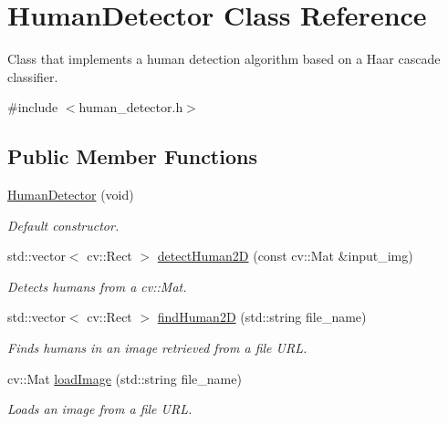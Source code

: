 \hypertarget{classHumanDetector}{\section{Human\-Detector Class Reference}
\label{classHumanDetector}
}


Class that implements a human detection algorithm based on a Haar cascade classifier.  




{\ttfamily \#include $<$human\-\_\-detector.\-h$>$}

\subsection*{Public Member Functions}
\begin{DoxyCompactItemize}
\item 
\hyperlink{classHumanDetector_ae20de86b32803a99c4f81741b8cd6cbb}{Human\-Detector} (void)
\begin{DoxyCompactList}\small\item\em Default constructor. \end{DoxyCompactList}\item 
std\-::vector$<$ cv\-::\-Rect $>$ \hyperlink{classHumanDetector_a9c559b1da68d3a89a8821132a589c528}{detect\-Human2\-D} (const cv\-::\-Mat \&input\-\_\-img)
\begin{DoxyCompactList}\small\item\em Detects humans from a cv\-::\-Mat. \end{DoxyCompactList}\item 
std\-::vector$<$ cv\-::\-Rect $>$ \hyperlink{classHumanDetector_a21d9e54a5fe1cc1bb955e68a1512f27f}{find\-Human2\-D} (std\-::string file\-\_\-name)
\begin{DoxyCompactList}\small\item\em Finds humans in an image retrieved from a file U\-R\-L. \end{DoxyCompactList}\item 
cv\-::\-Mat \hyperlink{classHumanDetector_ad3f7e211881e795c1e0e7521215a201d}{load\-Image} (std\-::string file\-\_\-name)
\begin{DoxyCompactList}\small\item\em Loads an image from a file U\-R\-L. \end{DoxyCompactList}\end{DoxyCompactItemize}
